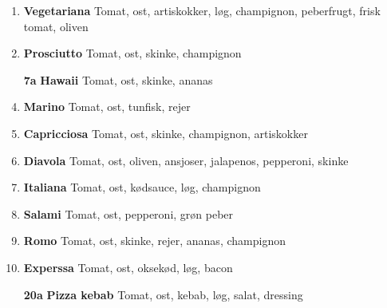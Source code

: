 \documentclass[danish,a4paper]{article}
\begin{document}
\begin{multicols}{2}
\begin{enumerate}[label={\large\textbf{\arabic*}.}]
    \item \textbf{\textcolor{vegigreen}{Vegetariana}} Tomat, ost, artiskokker, løg, champignon, peberfrugt, frisk tomat, oliven
    \item \textbf{Prosciutto} Tomat, ost, skinke, champignon 
    \item[\large\textbf{7a}] \textbf{Hawaii} Tomat, ost, skinke, ananas 
    \item \textbf{Marino} Tomat, ost, tunfisk, rejer
    \item \textbf{Capricciosa} Tomat, ost, skinke, champignon, artiskokker
    \item \textbf{Diavola} Tomat, ost, oliven, ansjoser, jalapenos, pepperoni, skinke
    \item \textbf{Italiana} Tomat, ost, kødsauce, løg, champignon 
    \item \textbf{Salami} Tomat, ost, pepperoni, grøn peber
    \item \textbf{Romo} Tomat, ost, skinke, rejer, ananas, champignon
    \setcounter{enumi}{16}
    \item \textbf{Experssa} Tomat, ost, oksekød, løg, bacon
    \item[\large\textbf{20a}] \textbf{Pizza kebab} Tomat, ost, kebab, løg, salat, dressing
\end{enumerate}

\end{multicols}
\end{document}

